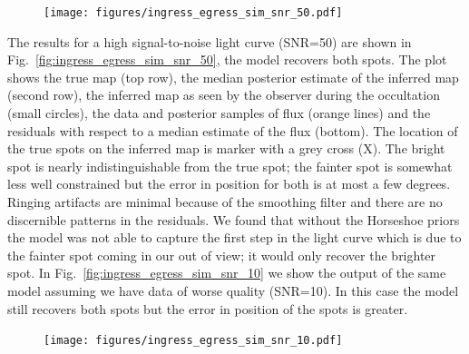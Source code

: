 \documentclass[modern]{aastex62}
\begin{document}
\begin{figure}[t!]
    \begin{centering}
    \texttt{[image: figures/ingress\_egress\_sim\_snr\_50.pdf]}
    \end{centering}
\end{figure}


The results for a high signal-to-noise light curve (SNR=50) are shown in Fig.~\ref{fig:ingress_egress_sim_snr_50}, the model recovers both spots.
The plot shows the true map (top row), the median posterior estimate of the inferred map (second row), the inferred map as seen by the observer during the occultation (small circles), the data and posterior samples of flux (orange lines) and the residuals with respect to a median estimate of the flux (bottom). 
The location of the true spots on the inferred map is marker with a grey cross (X).
The bright spot is nearly indistinguishable from the true spot; the fainter spot is somewhat less well constrained but the error in position for both is at most a few degrees.
Ringing artifacts are minimal because of the smoothing filter and there are no discernible patterns in the residuals.
We found that without the Horseshoe priors the model was not able to capture the first step in the light curve which is due to the fainter spot coming in our out of view; it would only recover the brighter spot.
In Fig.~\ref{fig:ingress_egress_sim_snr_10} we show the output of the same model assuming we have data of worse quality (SNR=10). 
In this case the model still recovers both spots but the error in position of the spots is greater.

\begin{figure}[t!]
    \begin{centering}
        \texttt{[image: figures/ingress\_egress\_sim\_snr\_10.pdf]}
    \end{centering}
\end{figure}
\end{document}
